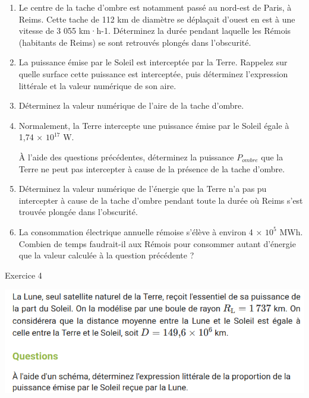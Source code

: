 \documentclass[10pt]{article}
\begin{document}
\begin{enumerate}
	\item Le centre de la tache d'ombre est notamment passé au nord-est de Paris, à Reims.
	      Cette tache de 112 km de diamètre se déplaçait d'ouest en est à une vitesse de 3 055 km·h-1.
	      Déterminez la durée pendant laquelle les Rémois (habitants de Reims) se sont retrouvés plongés dans l'obscurité.

	\item La puissance émise par le Soleil est interceptée par la Terre.
	      Rappelez sur quelle surface cette puissance est interceptée, puis déterminez l'expression
	      littérale et la valeur numérique de son aire.

	\item Déterminez la valeur numérique de l'aire de la tache d'ombre.

	\item Normalement, la Terre intercepte une puissance émise par le Soleil égale à 1,74 × $10^{17}$ W.

	      À l'aide des questions précédentes, déterminez la puissance $P_{ombre}$ que la Terre ne peut pas intercepter
	      à cause de la présence de la tache d'ombre.

	\item Déterminez la valeur numérique de l'énergie que la Terre n'a pas pu intercepter à cause de la tache
	      d'ombre pendant toute la durée où Reims s'est trouvée plongée dans l'obscurité.

	\item La consommation électrique annuelle rémoise s'élève à environ 4 × $10^5$ MWh.
	      Combien de temps faudrait-il aux Rémois pour consommer autant d'énergie que la valeur calculée à la question précédente ?
\end{enumerate}


\begin{center}
	Exercice 4 \vspace{10pt}

	\includegraphics[scale=0.5]{ex_lune.png}
\end{center}
\end{document}
